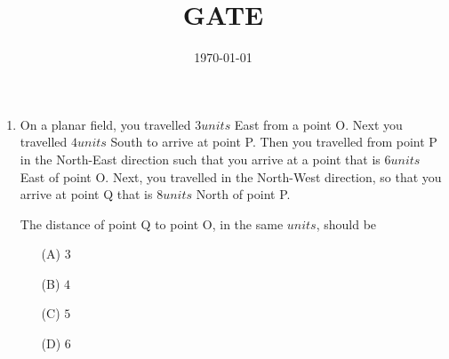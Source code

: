 \documentclass[12pt]{article}
\begin{document}
\title{GATE}
\date{\today}
\maketitle
\begin{enumerate}
	\section*{GATE BM - 2021}
\item 
	On a planar field, you travelled $3 units$ East from a point O. Next you 
travelled $4 units$ South to arrive at point P. Then you travelled from point P in the
North-East direction such that you arrive at a point that is $6 units$ East of
point O. Next, you travelled in the North-West direction, so that you arrive
at point Q that is $8 units$ North of point P. 

The distance of point Q to point O, in the same $units$, should be \underline{\hspace{2cm}}
\begin{enumerate}
\item[(A)] $3$
\item[(B)] $4$
\item[(C)] $5$
\item[(D)] $6$
\end{enumerate}
\end{enumerate}
\end{document}
